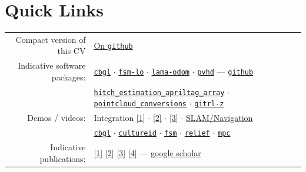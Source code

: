 \documentclass[a4paper,10pt,twoside]{article}
\begin{document}
\section*{Quick Links}

\begin{tabular}{rp{10.5cm}}

Compact version of this CV & \href{https://docs.google.com/viewerng/viewer?url=https://raw.githubusercontent.com/li9i/cv/master/compact/cv_compact_alexandros_filotheou.pdf}{On \texttt{github}} \\

Indicative software packages: &
\href{https://github.com/cbgl/cbgl}{\texttt{cbgl}} $\cdot$
\href{https://github.com/fourier-scan-matcher/fsm-lo}{\texttt{fsm-lo}} $\cdot$
\href{https://github.com/li9i/lama-odom}{\texttt{lama-odom}} $\cdot$
\href{https://github.com/li9i/pandora\_vision\_2014/tree/hydro-devel/pandora\_vision\_hole\_detector}{\texttt{pvhd}} ---  \href{https://github.com/li9i}{\texttt{github}} \\

  & \href{https://index.ros.org/p/hitch_estimation_apriltag_array/#humble}{\texttt{hitch\_estimation\_apriltag\_array}} $\cdot$
\href{https://index.ros.org/r/pointcloud_conversions/#lyrical}{\texttt{pointcloud\_conversions}} $\cdot$
\href{https://github.com/li9i/gitrl-z}{\texttt{gitrl-z}} \\

Demos / videos: &
Integration \href{https://www.youtube.com/shorts/TSIXd5L-Hxk}{[1]} $\cdot$
\href{https://www.youtube.com/watch?v=ViU-9DLi2-M}{[2]} $\cdot$
\href{https://www.youtube.com/watch?v=xuIbOL-MPRk\&t=10s}{[3]} $\cdot$
\href{https://youtu.be/bo4lMI640DY?t=10}{SLAM/Navigation} \\

  & \href{https://www.youtube.com/watch?v=xaDKjI0WkDc}{\texttt{cbgl}} $\cdot$ \href{https://cultureid.web.auth.gr/?page\_id=200&lang=en}{\texttt{cultureid}} $\cdot$ \href{https://www.youtube.com/watch?v=hB4qsHCEXGI}{\texttt{fsm}} $\cdot$ \href{https://relief.web.auth.gr/}{\texttt{relief}} $\cdot$ \href{https://www.youtube.com/watch?v=937OZez1iN8}{\texttt{mpc}}\\

Indicative publications: &
\href{https://ieeexplore.ieee.org/abstract/document/10802235}{[1]}
\href{https://ieeexplore.ieee.org/abstract/document/9981228}{[2]}
\href{https://www.sciencedirect.com/science/article/abs/pii/S0921889021002323}{[3]}
\href{https://www.tandfonline.com/doi/full/10.1080/00207179.2018.1514129}{[4]} --- \href{https://scholar.google.com/citations?view\_op=list\_works\&hl=en\&user=9\_hI4hMAAAAJ}{google scholar}\\


\end{tabular}
\end{document}
